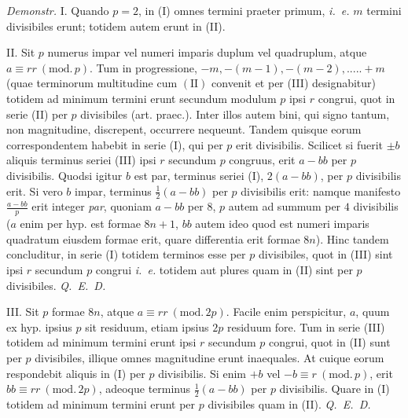 \textit{Demonstr.} I. Quando $p=2$, in (I) omnes termini praeter primum, \textit{i.\ e.} $m$ termini divisibiles erunt; totidem autem erunt in (II).

II. Sit $p$ numerus impar vel numeri imparis duplum vel quadruplum, atque $a\equiv rr\ (\mathrm{mod.}\,p)$. Tum in progressione, $-m,-(m-1),-(m-2),.....+m$ (quae terminorum multitudine cum $(\mathrm{II})$ convenit et per (III) designabitur) totidem ad minimum termini erunt secundum modulum $p$ ipsi $r$ congrui, quot in serie (II) per $p$ divisibiles (art. praec.). Inter illos autem bini, qui signo tantum, non magnitudine, discrepent, occurrere nequeunt. Tandem quisque eorum correspondentem habebit in serie (I), qui per $p$ erit divisibilis. Scilicet si fuerit $\pm b$ aliquis terminus seriei (III) ipsi $r$ secundum $p$ congruus, erit $a-bb$ per $p$ divisibilis. Quodsi igitur $b$ est par, terminus seriei (I), $2(a-bb)$, per $p$ divisibilis erit. Si vero $b$ impar, terminus $\frac12(a-bb)$ per $p$ divisibilis erit: namque manifesto $\frac{a-bb}{p}$ erit integer \textit{par}, quoniam $a-bb$ per $8$, $p$ autem ad summum per $4$ divisibilis ($a$ enim per hyp. est formae $8n+1$, $bb$ autem ideo quod est numeri imparis quadratum eiusdem formae erit, quare differentia erit formae $8n$). Hinc tandem concluditur, in serie (I) totidem terminos esse per $p$ divisibiles, quot in (III) sint ipsi $r$ secundum $p$ congrui \textit{i.\ e.} totidem aut plures quam in (II) sint per $p$ divisibiles. \textit{Q.\ E.\ D.}

III. Sit $p$ formae $8n$, atque $a\equiv rr\ (\mathrm{mod.}\,2p)$. Facile enim perspicitur, $a$, quum ex hyp. ipsius $p$ sit residuum, etiam ipsius $2p$ residuum fore. Tum in serie (III) totidem ad minimum termini erunt ipsi $r$ secundum $p$ congrui, quot in (II) sunt per $p$ divisibiles, illique omnes magnitudine erunt inaequales. At cuique eorum respondebit aliquis in (I) per $p$ divisibilis. Si enim $+b$ vel $-b\equiv r\ (\mathrm{mod.}\,p)$, erit $bb\equiv rr\ (\mathrm{mod.}\,2p)$, adeoque terminus $\frac12(a-bb)$ per $p$ divisibilis. Quare in (I) totidem ad minimum termini erunt per $p$ divisibiles quam in (II). \textit{Q.\ E.\ D.}

